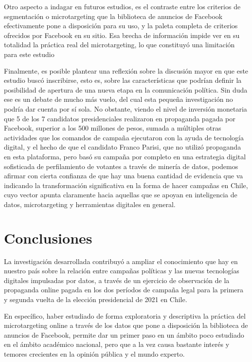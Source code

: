 \documentclass[
  10pt,
  letterpaper,
]{report}
\begin{document}
Otro aspecto a indagar en futuros estudios, es el contraste entre los
criterios de segmentación o microtargeting que la biblioteca de anuncios
de Facebook efectivamente pone a disposición para su uso, y la paleta
completa de criterios ofrecidos por Facebook en su sitio. Esa brecha de
información impide ver en su totalidad la práctica real del
microtargeting, lo que constituyó una limitación para este estudio

Finalmente, es posible plantear una reflexión sobre la discusión mayor
en que este estudio buscó inscribirse, esto es, sobre las
características que podrían definir la posibilidad de apertura de una
nueva etapa en la comunicación política. Sin duda ese es un debate de
mucho más vuelo, del cual esta pequeña investigación no podría dar
cuenta por sí sola. No obstante, viendo el nivel de inversión monetaria
que 5 de los 7 candidatos presidenciales realizaron en propaganda pagada
por Facebook, superior a los 500 millones de pesos, sumada a múltiples
otras actividades que los comandos de campaña ejecutaron con la ayuda de
tecnología digital, y el hecho de que el candidato Franco Parisi, que no
utilizó propaganda en esta plataforma, pero basó su campaña por completo
en una estrategia digital sofisticada de perfilamiento de votantes a
través de minería de datos, podemos afirmar con cierta confianza de que
hay una buena cantidad de evidencia que va indicando la transformación
significativa en la forma de hacer campañas en Chile, cuyo vector apunta
claramente hacia aquellas que se apoyan en inteligencia de datos,
microtargeting y herramientas digitales en general.

\hypertarget{conclusiones}{%
\chapter{Conclusiones}\label{conclusiones}}

La investigación desarrollada contribuyó a ampliar el conocimiento que
hay en nuestro país sobre la relación entre campañas políticas y las
nuevas tecnologías digitales impulsadas por datos, a través de un
ejercicio de observación de la propaganda online pagada en los dos
períodos de campaña legal para la primera y segunda vuelta de la
elección presidencial de 2021 en Chile.

En específico, haber estudiado de forma exploratoria y descriptiva la
práctica del microtargeting online a través de los datos que pone a
disposición la biblioteca de anuncios de Facebook, permite dar un primer
paso en un ámbito poco estudiado en el ámbito académico nacional, pero
que a la vez causa bastante interés y temores crecientes en la opinión
pública y el mundo experto.
\end{document}
